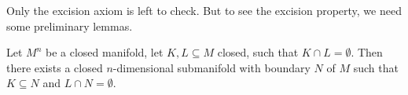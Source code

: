 \documentclass[a4paper,11pt]{article}
\begin{document}
\begin{comment}[Transversality, Sard, Mayer-Vi\"etoris,...]
Before checking the next axioms, we need to do some more differential topology. (Maybe I will put this in chapter 1\dots)

\begin{definition}[Tangent space\ \cite{lee}]
\end{definition}

Need a few more things, differential, etc.

\begin{definition}[Transversality\ \cite{brocker}]
    Let \(f:M\to N\) a smooth map between manifolds. Let \(U\subseteq N\) be an (\(n-k\))-dimensional submanifold of \(N\) 
\end{definition}
Maybe Lee's definition is better.\\

\begin{definition}[Regular value]
\end{definition}

\begin{theorem}[Sard's theorem\ \cite{lee}]
\end{theorem}

I will not prove this theorem, a proof can be found in\ \cite{lee}.

\begin{definition}[Seperating function\cite{brocker}]
\end{definition}

\begin{lemma}
    Slogan: The Mayer-Vi\"etoris sequence is equivalent to the excision axiom.
\end{lemma}

\begin{lemma}
    The Mayer-Vi\"etoris sequence
    \[\dots\xrightarrow{\partial}\mathfrak{N}_n(X_0\cap X_1)\xrightarrow{\alpha}\mathfrak{N}_n(X_0\oplus\mathfrak{N}_n(X_1))\xrightarrow{\beta}\mathfrak{N}_n(X)\xrightarrow{\partial}\mathfrak{N}_{n-1}(X_0\cap X_1)\xrightarrow{\alpha}\dots\]
    is exact.
\end{lemma}

\end{comment}

Only the excision axiom is left to check. But to see the excision property, we need some preliminary lemmas.

\begin{lemma}\label{plemma}%
    Let \(M^n\) be a closed manifold, let \(K,L\subseteq M\) closed, such that \(K\cap L=\emptyset\). Then there exists a closed \(n\)-dimensional submanifold with boundary \(N\) of \(M\) such that \(K\subseteq N\) and \(L\cap N=\emptyset\).
\end{lemma}
\end{document}
